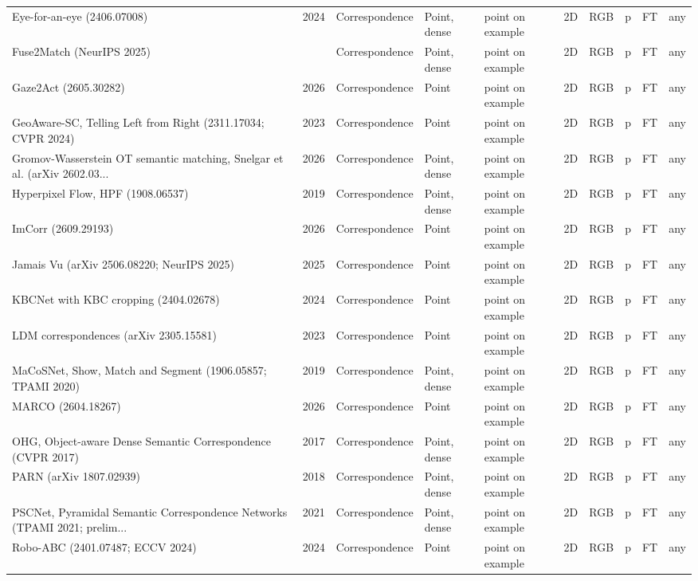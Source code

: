 {\begin{landscape}
\begin{longtable}{@{}p{4.6cm}rp{2.0cm}lllllcl@{}}
Eye-for-an-eye (2406.07008) & 2024 & Correspondence & Point, dense & point on example & 2D & RGB & p & FT & any \\
Fuse2Match (NeurIPS 2025) &  & Correspondence & Point, dense & point on example & 2D & RGB & p & FT & any \\
Gaze2Act (2605.30282) & 2026 & Correspondence & Point & point on example & 2D & RGB & p & FT & any \\
GeoAware-SC, Telling Left from Right (2311.17034; CVPR 2024) & 2023 & Correspondence & Point & point on example & 2D & RGB & p & FT & any \\
Gromov-Wasserstein OT semantic matching, Snelgar et al. (arXiv 2602.03... & 2026 & Correspondence & Point, dense & point on example & 2D & RGB & p & FT & any \\
Hyperpixel Flow, HPF (1908.06537) & 2019 & Correspondence & Point, dense & point on example & 2D & RGB & p & FT & any \\
ImCorr (2609.29193) & 2026 & Correspondence & Point & point on example & 2D & RGB & p & FT & any \\
Jamais Vu (arXiv 2506.08220; NeurIPS 2025) & 2025 & Correspondence & Point & point on example & 2D & RGB & p & FT & any \\
KBCNet with KBC cropping (2404.02678) & 2024 & Correspondence & Point & point on example & 2D & RGB & p & FT & any \\
LDM correspondences (arXiv 2305.15581) & 2023 & Correspondence & Point & point on example & 2D & RGB & p & FT & any \\
MaCoSNet, Show, Match and Segment (1906.05857; TPAMI 2020) & 2019 & Correspondence & Point, dense & point on example & 2D & RGB & p & FT & any \\
MARCO (2604.18267) & 2026 & Correspondence & Point & point on example & 2D & RGB & p & FT & any \\
OHG, Object-aware Dense Semantic Correspondence (CVPR 2017) & 2017 & Correspondence & Point, dense & point on example & 2D & RGB & p & FT & any \\
PARN (arXiv 1807.02939) & 2018 & Correspondence & Point, dense & point on example & 2D & RGB & p & FT & any \\
PSCNet, Pyramidal Semantic Correspondence Networks (TPAMI 2021; prelim... & 2021 & Correspondence & Point, dense & point on example & 2D & RGB & p & FT & any \\
Robo-ABC (2401.07487; ECCV 2024) & 2024 & Correspondence & Point & point on example & 2D & RGB & p & FT & any \\

\end{longtable}
\end{landscape}}
